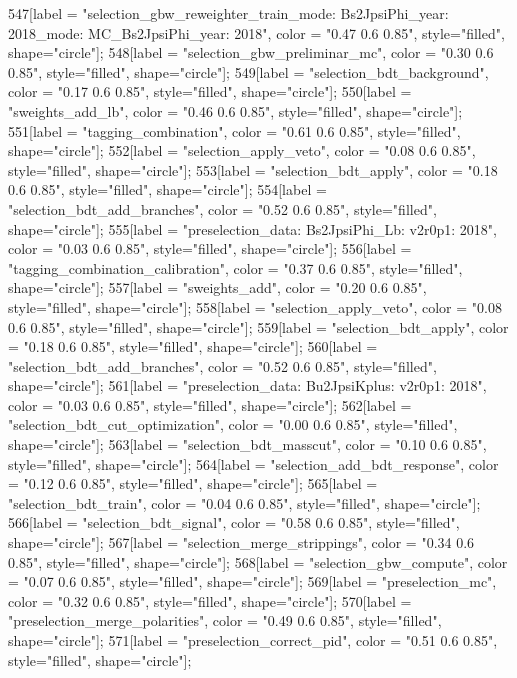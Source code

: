 {	547[label = "selection_gbw_reweighter_train\ndata_mode: Bs2JpsiPhi\ndata_year: 2018\nmc_mode: MC_Bs2JpsiPhi\nmc_year: 2018", color = "0.47 0.6 0.85", style="filled", shape="circle"];
	548[label = "selection_gbw_preliminar_mc", color = "0.30 0.6 0.85", style="filled", shape="circle"];
	549[label = "selection_bdt_background", color = "0.17 0.6 0.85", style="filled", shape="circle"];
	550[label = "sweights_add_lb", color = "0.46 0.6 0.85", style="filled", shape="circle"];
	551[label = "tagging_combination", color = "0.61 0.6 0.85", style="filled", shape="circle"];
	552[label = "selection_apply_veto", color = "0.08 0.6 0.85", style="filled", shape="circle"];
	553[label = "selection_bdt_apply", color = "0.18 0.6 0.85", style="filled", shape="circle"];
	554[label = "selection_bdt_add_branches", color = "0.52 0.6 0.85", style="filled", shape="circle"];
	555[label = "preselection_data\nmode: Bs2JpsiPhi_Lb\nversion: v2r0p1\nyear: 2018", color = "0.03 0.6 0.85", style="filled", shape="circle"];
	556[label = "tagging_combination_calibration", color = "0.37 0.6 0.85", style="filled", shape="circle"];
	557[label = "sweights_add", color = "0.20 0.6 0.85", style="filled", shape="circle"];
	558[label = "selection_apply_veto", color = "0.08 0.6 0.85", style="filled", shape="circle"];
	559[label = "selection_bdt_apply", color = "0.18 0.6 0.85", style="filled", shape="circle"];
	560[label = "selection_bdt_add_branches", color = "0.52 0.6 0.85", style="filled", shape="circle"];
	561[label = "preselection_data\nmode: Bu2JpsiKplus\nversion: v2r0p1\nyear: 2018", color = "0.03 0.6 0.85", style="filled", shape="circle"];
	562[label = "selection_bdt_cut_optimization", color = "0.00 0.6 0.85", style="filled", shape="circle"];
	563[label = "selection_bdt_masscut", color = "0.10 0.6 0.85", style="filled", shape="circle"];
	564[label = "selection_add_bdt_response", color = "0.12 0.6 0.85", style="filled", shape="circle"];
	565[label = "selection_bdt_train", color = "0.04 0.6 0.85", style="filled", shape="circle"];
	566[label = "selection_bdt_signal", color = "0.58 0.6 0.85", style="filled", shape="circle"];
	567[label = "selection_merge_strippings", color = "0.34 0.6 0.85", style="filled", shape="circle"];
	568[label = "selection_gbw_compute", color = "0.07 0.6 0.85", style="filled", shape="circle"];
	569[label = "preselection_mc", color = "0.32 0.6 0.85", style="filled", shape="circle"];
	570[label = "preselection_merge_polarities", color = "0.49 0.6 0.85", style="filled", shape="circle"];
	571[label = "preselection_correct_pid", color = "0.51 0.6 0.85", style="filled", shape="circle"];
}
